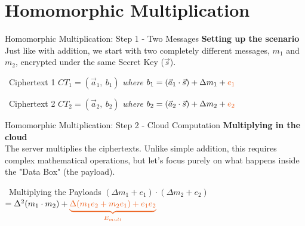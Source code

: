 \documentclass[aspectratio=169, 10pt]{beamer}
\begin{document}
\section{Homomorphic Multiplication}
\begin{frame}{Homomorphic Multiplication: Step 1 - Two Messages}
    \Large
    \textbf{Setting up the scenario} \\
    \vspace{0.2cm}
    \normalsize
    Just like with addition, we start with two completely different messages, $m_1$ and $m_2$, encrypted under the same Secret Key ($\vec{s}$).
    \vspace{0.3cm}
    
    \begin{block}{\faLock \ Ciphertext 1}
        \centering
        \large ${CT_1} = (\vec{a}_1, \ b_1)$ \quad \textit{where} \quad $b_1 = (\vec{a}_1 \cdot \vec{s}) + \Delta m_1 + \textcolor{AccentOrange}{{e_1}}$
        \vspace{0.1cm}
    \end{block}
    \vspace{0.2cm}
    
    \begin{block}{\faLock \ Ciphertext 2}
        \centering
        \large ${CT_2} = (\vec{a}_2, \ b_2)$ \quad \textit{where} \quad $b_2 = (\vec{a}_2 \cdot \vec{s}) + \Delta m_2 + \textcolor{AccentOrange}{{e_2}}$
        \vspace{0.1cm}
    \end{block}
\end{frame}

\begin{frame}{Homomorphic Multiplication: Step 2 - Cloud Computation}
    \Large
    \textbf{Multiplying in the cloud} \\
    \vspace{0.2cm}
    \normalsize
    The server multiplies the ciphertexts. Unlike simple addition, this requires complex mathematical operations, but let's focus purely on what happens inside the "Data Box" (the payload).
    \vspace{0.4cm}
    
    \begin{alertblock}{\faTimes \ Multiplying the Payloads}
        \centering
        \vspace{0.4cm}
        \large $(\Delta m_1 + e_1) \cdot (\Delta m_2 + e_2)$ \\[0.5cm]
        \Large $= \Delta^2(m_1 \cdot m_2) + \textcolor{AccentOrange}{\underbrace{\Delta(m_1 e_2 + m_2 e_1) + e_1 e_2}_{{E_{mult}}}}$
        \vspace{0.4cm}
    \end{alertblock}
\end{frame}
\end{document}
